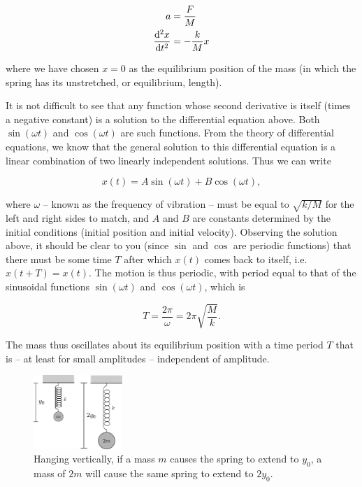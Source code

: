 \begin{equation}
\begin{aligned}
    a &= \frac{F}{M} \\
    \dv[2]{x}{t}&=-\frac{k}{M} x
\end{aligned}
\label{diffEqnSimpleSpring}
\end{equation}

where we have chosen $x = 0$ as the equilibrium position of the mass (in which the spring has its unstretched, or equilibrium, length).


It is not difficult to see that any function whose second derivative is itself (times a negative constant) is a solution to the differential equation above. Both $\sin (\omega t)$ and $\cos (\omega t)$ are such functions. From the theory of differential equations, we know that the general solution to this differential equation is a linear combination of two linearly independent solutions. Thus we can write

\begin{equation*}
    x(t) = A \sin(\omega t) + B \cos(\omega t),
\end{equation*}

where $\omega$ -- known as the frequency of vibration -- must be equal to $\sqrt{k/M}$ for the left and right sides to match, and $A$ and $B$ are constants determined by the initial conditions (initial position and initial velocity). Observing the solution above, it should be clear to you (since $\sin$ and $\cos$ are periodic functions) that there must be some time $T$ after which $x(t)$ comes back to itself, i.e.\ $x(t+T) = x(t)$. The motion is thus periodic, with period equal to that of the sinusoidal functions $\sin(\omega t)$ and $\cos(\omega t)$, which is

\begin{equation}
    T = \frac{2 \pi}{\omega} = 2\pi \sqrt{\frac{M}{k}}.
    \label{masslessTime}
\end{equation}

The mass thus oscillates about its equilibrium position with a time period $T$ that is -- at least for small amplitudes -- independent of amplitude.


\begin{figure}[!htb]
    \centering
    \includegraphics[width=0.3\textwidth]{figs/springMassVertical.png}
    \caption{Hanging vertically, if a mass $m$ causes the spring to extend to $y_0$, a mass of $2m$ will cause the same spring to extend to $2 y_0$.}
    \label{fig:springMassVertical}
\end{figure}


